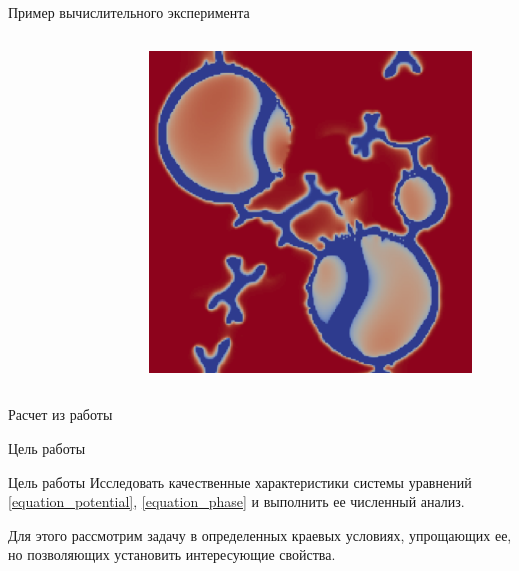 \begin{frame}{Пример вычислительного эксперимента}
\begin{columns}
\begin{figure}
\end{figure}
\begin{figure}
	\includegraphics[width=\textwidth]{figures/model_example_3.png}
\end{figure}
\end{columns}
\begin{center}
	Расчет из работы \cite{zipunova_experiment}
\end{center}
\end{frame}


\begin{frame}{Цель работы}
\begin{block}{Цель работы}
	Исследовать качественные характеристики системы уравнений \eqref{equation_potential},
	\eqref{equation_phase} и выполнить ее численный анализ.
\end{block}
Для этого рассмотрим задачу в определенных краевых условиях, упрощающих ее, но позволяющих
установить интересующие свойства.
\end{frame}